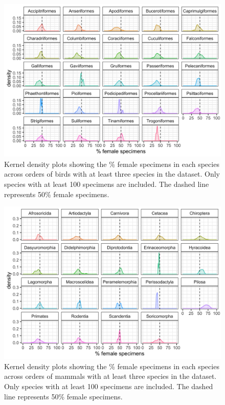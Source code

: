 \documentclass[a4paper, 12pt]{article}
\begin{document}
\begin{figure}[H]
 \centering
  \includegraphics[width = \linewidth]{figures/orders-density-birds-all.png}
  \caption{Kernel density plots showing the \% female specimens in each species across orders of birds with at least three species in the dataset. 
  Only species with at least 100 specimens are included. 
  The dashed line represents 50\% female specimens.}
  \label{fig-bird-orders}
\end{figure}

\begin{figure}[H]
 \centering
  \includegraphics[width = \linewidth]{figures/orders-density-mammals-all.png}
  \caption{Kernel density plots showing the \% female specimens in each species across orders of mammals with at least three species in the dataset. 
  Only species with at least 100 specimens are included. 
  The dashed line represents 50\% female specimens.}
  \label{fig-mammal-orders}
\end{figure}
\end{document}
